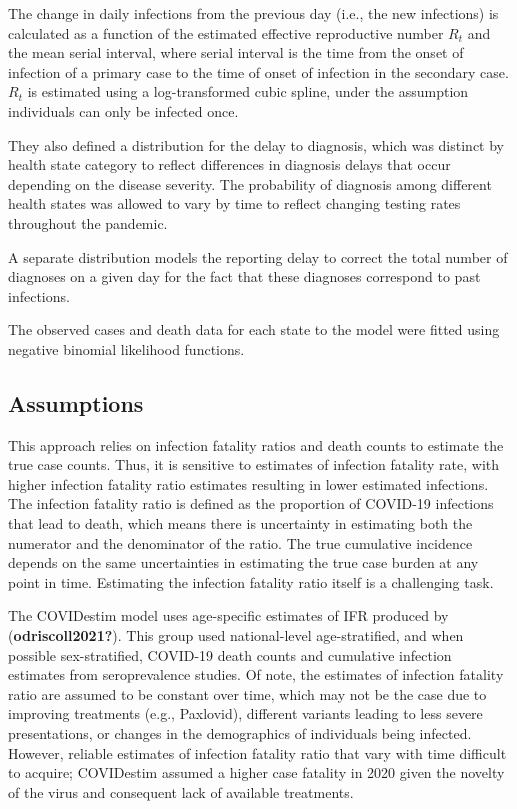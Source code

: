 \documentclass[12pt,twoside]{smiththesis}
\begin{document}
The change in daily infections from the previous day (i.e., the new infections) is calculated as a function of the estimated effective reproductive number \(R_t\) and the mean serial interval, where serial interval is the time from the onset of infection of a primary case to the time of onset of infection in the secondary case. \(R_t\) is estimated using a log-transformed cubic spline, under the assumption individuals can only be infected once.

They also defined a distribution for the delay to diagnosis, which was distinct by health state category to reflect differences in diagnosis delays that occur depending on the disease severity.
The probability of diagnosis among different health states was allowed to vary by time to reflect changing testing rates throughout the pandemic.

A separate distribution models the reporting delay to correct the total number of diagnoses on a given day for the fact that these diagnoses correspond to past infections.

The observed cases and death data for each state to the model were fitted using negative binomial likelihood functions.

\hypertarget{assumptions}{%
\subsection{Assumptions}\label{assumptions}}

This approach relies on infection fatality ratios and death counts to estimate the true case counts. Thus, it is sensitive to estimates of infection fatality rate, with higher infection fatality ratio estimates resulting in lower estimated infections. The infection fatality ratio is defined as the proportion of COVID-19 infections that lead to death, which means there is uncertainty in estimating both the numerator and the denominator of the ratio. The true cumulative incidence depends on the same uncertainties in estimating the true case burden at any point in time. Estimating the infection fatality ratio itself is a challenging task.

The COVIDestim model uses age-specific estimates of IFR produced by (\textbf{odriscoll2021?}). This group used national-level age-stratified, and when possible sex-stratified, COVID-19 death counts and cumulative infection estimates from seroprevalence studies. Of note, the estimates of infection fatality ratio are assumed to be constant over time, which may not be the case due to improving treatments (e.g., Paxlovid), different variants leading to less severe presentations, or changes in the demographics of individuals being infected. However, reliable estimates of infection fatality ratio that vary with time difficult to acquire; COVIDestim assumed a higher case fatality in 2020 given the novelty of the virus and consequent lack of available treatments.
\end{document}
